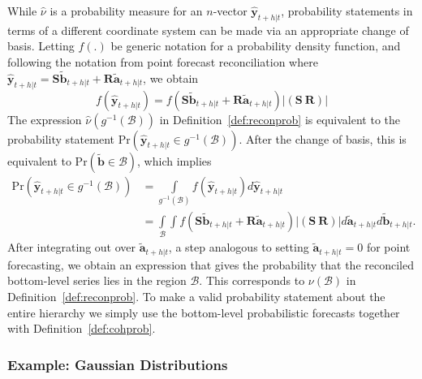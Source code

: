 \documentclass[12pt]{article}
\theoremstyle{definition}
\begin{document}
While $\hat{\nu}$ is a probability measure for an $n$-vector $\hat{\bm{y}}_{t+h|t}$, probability statements in terms of a different coordinate system can be made via an appropriate change of basis. Letting $f(.)$ be generic notation for a probability density function, and following the notation from point forecast reconciliation where $\hat{\bm{y}}_{t+h|t}=\bm{S}\tilde{\bm{b}}_{t+h|t}+\bm{R}\tilde{\bm{a}}_{t+h|t}$, we obtain
\begin{equation}
f(\hat{\bm{y}}_{t+h|t})=f(\bm{S}\tilde{\bm{b}}_{t+h|t}+\bm{R}\tilde{\bm{a}}_{t+h|t})|(\bm{S}~\bm{R})|
\end{equation}
The expression $\hat{\nu}(g^{-1}(\mathcal{B}))$ in Definition~\ref{def:reconprob} is equivalent to the probability statement $\text{Pr}(\hat{\bm{y}}_{t+h|t}\in g^{-1}(\mathcal{B}))$. After the change of basis, this is equivalent to $\text{Pr}(\tilde{\bm{b}}\in \mathcal{B})$, which implies
\begin{align}
\text{Pr}(\hat{\bm{y}}_{t+h|t}\in g^{-1}(\mathcal{B}))&=\int\limits_{g^{-1}(\mathcal{B})}f(\hat{\bm{y}}_{t+h|t})d\hat{\bm{y}}_{t+h|t}\\
&=\int\limits_{\mathcal{B}}\int f(\bm{S}\tilde{\bm{b}}_{t+h|t}+\bm{R}\tilde{\bm{a}}_{t+h|t})|(\bm{S}~\bm{R})|d\tilde{\bm{a}}_{t+h|t}d\tilde{\bm{b}}_{t+h|t}.
\end{align}
After integrating out over $\tilde{\bm{a}}_{t+h|t}$, a step analogous to setting $\tilde{\bm{a}}_{t+h|t}=0$ for point forecasting, we obtain an expression that gives the probability that the reconciled bottom-level series lies in the region $\mathcal{B}$. This corresponds to $\nu(\mathcal{B})$ in Definition~\ref{def:reconprob}. To make a valid probability statement about the entire hierarchy we simply use the bottom-level probabilistic forecasts together with Definition~\ref{def:cohprob}.

\subsubsection*{Example: Gaussian Distributions}
\end{document}
